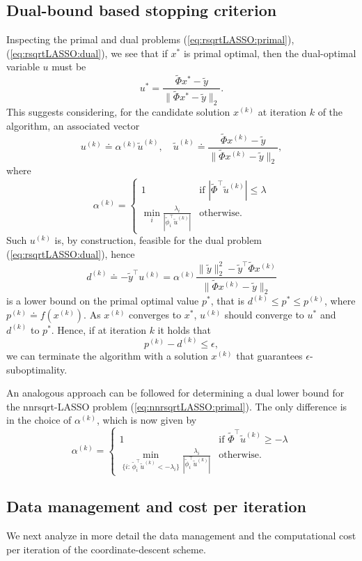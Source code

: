 \documentclass[11pt]{article}
\newcommand{\tran}{^{\top}}
\newcommand{\lam}{\lambda}
\newcommand{\ba}{\begin{array}}
\newcommand{\ea}{\end{array}}
\newcommand{\dss}{\displaystyle}
\begin{document}
\subsection{Dual-bound based stopping criterion}
\label{sec:dualbound}
Inspecting the primal and dual problems (\ref{eq:rsqrtLASSO:primal}), (\ref{eq:rsqrtLASSO:dual}), we see that if
$x^*$ is primal optimal, then the dual-optimal variable $u$ must be
\[
u^* = \frac{\tilde \Phi x^* - \tilde y}{\|\tilde \Phi x^* - \tilde y\|_2}.
\]
This suggests considering,
for the candidate solution $x^{(k)}$ at iteration $k$ of the algorithm,  an associated vector
\[
u^{(k)}  \doteq \alpha^{(k)} 
\tilde u^{(k)},\quad    
 \tilde u^{(k)}\doteq \frac{\tilde \Phi x^{(k)} - \tilde y }{\|\tilde \Phi x^{(k)} - \tilde y \|_2},
\]
where
\[
\alpha^{(k)}
 = \left\{ \ba{ll} 
1 & \mbox{if } |\tilde \Phi\tran  \tilde u^{(k)}| \leq \lam \\
{\dss \min_{i} \frac{\lam_i}{|\tilde \phi_i\tran  \tilde u^{(k)}| } }& \mbox{otherwise. }
\ea\right.
\]
Such $u^{(k)}$ is, by construction, feasible for the dual problem  (\ref{eq:rsqrtLASSO:dual}), hence 
\[
d^{(k)} \doteq -\tilde y\tran u^{(k)} = \alpha^{(k)}  \frac{\|\tilde y\|_2^2-\tilde y\tran\tilde \Phi x^{(k)}}{\|\tilde \Phi x^{(k)} - \tilde y \|_2}
\]
is a lower bound on the primal optimal value $p^*$, that is $d^{(k)} \leq p^* \leq p^{(k)}$,
where $p^{(k)} \doteq f(x^{(k)})$.
As $x^{(k)}$ converges to $x^*$, $u^{(k)} $ should converge to $u^*$ and $d^{(k)}$ to $p^*$.
Hence, if at iteration $k$ it holds that
\[
p^{(k)} - d^{(k)} \leq \epsilon,
\]
we can terminate the algorithm with a solution $x^{(k)}$ that guarantees $\epsilon$-suboptimality.

An analogous approach can be followed for determining a dual lower bound for the 
nnrsqrt-LASSO problem (\ref{eq:nnrsqrtLASSO:primal}). The only difference is in the choice of $\alpha^{(k)}$, which is now given by
\[
\alpha^{(k)}
 = \left\{ \ba{ll} 
1 & \mbox{if } \tilde \Phi\tran  \tilde u^{(k)} \geq - \lam \\
{\dss \min_{\{i:\, \tilde \phi_i\tran  \tilde u^{(k)} < -\lam_i\}} \frac{\lam_i}{|\tilde \phi_i\tran  \tilde u^{(k)}|} }& \mbox{otherwise. }
\ea\right.
\]

\subsection{Data management and cost per iteration}
\label{sec:cd-iterate}
We next analyze in more detail 
the data management and
the computational cost per iteration of the coordinate-descent scheme.
\end{document}
